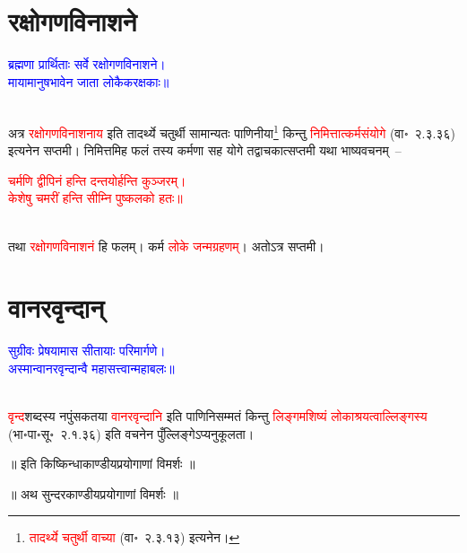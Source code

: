 \section[रक्षोगणविनाशने]{रक्षोगणविनाशने}
\centering\textcolor{blue}{ब्रह्मणा प्रार्थिताः सर्वे रक्षोगणविनाशने।\nopagebreak\\
मायामानुषभावेन जाता लोकैकरक्षकाः॥}\nopagebreak\\
\\
\begin{sloppypar}\justifying\noindent\hspace{10mm} अत्र \textcolor{red}{रक्षोगण\-विनाशनाय} इति तादर्थ्ये चतुर्थी सामान्यतः पाणिनीया\footnote{\textcolor{red}{तादर्थ्ये चतुर्थी वाच्या} (वा॰~२.३.१३) इत्यनेन।} किन्तु \textcolor{red}{निमित्तात्कर्म\-संयोगे} (वा॰~२.३.३६) इत्यनेन सप्तमी। निमित्तमिह फलं तस्य कर्मणा सह योगे तद्वाचकात्सप्तमी यथा भाष्य\-वचनम्~–\end{sloppypar}
\centering\textcolor{red}{चर्मणि द्वीपिनं हन्ति दन्तयोर्हन्ति कुञ्जरम्।\nopagebreak\\
केशेषु चमरीं हन्ति सीम्नि पुष्कलको हतः॥}\nopagebreak\\
\\
\begin{sloppypar}\justifying\noindent\hspace{10mm} तथा \textcolor{red}{रक्षोगण\-विनाशनं} हि फलम्। कर्म \textcolor{red}{लोके जन्म\-ग्रहणम्‌}। अतोऽत्र सप्तमी।\end{sloppypar}
\section[वानरवृन्दान्]{वानरवृन्दान्‌}
\centering\textcolor{blue}{सुग्रीवः प्रेषयामास सीतायाः परिमार्गणे।\nopagebreak\\
अस्मान्वानरवृन्दान्वै महासत्त्वान्महाबलः॥}\nopagebreak\\
\\
\begin{sloppypar}\justifying\noindent \textcolor{red}{वृन्द}\-शब्दस्य नपुंसकतया \textcolor{red}{वानर\-वृन्दानि} इति पाणिनि\-सम्मतं किन्तु \textcolor{red}{लिङ्गमशिष्यं लोकाश्रयत्वाल्लिङ्गस्य} (भा॰पा॰सू॰~२.१.३६) इति वचनेन पुँल्लिङ्गेऽप्यनुकूलता।\end{sloppypar}
\vspace{2mm}
\centering ॥ इति किष्किन्धाकाण्डीयप्रयोगाणां विमर्शः ॥\nopagebreak\\
\vspace{4mm}
{}
\centering ॥ अथ सुन्दरकाण्डीयप्रयोगाणां विमर्शः ॥\nopagebreak\\
